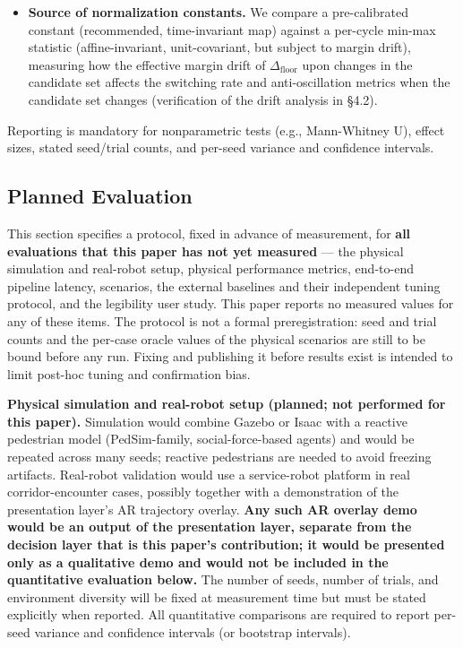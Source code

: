 \documentclass[11pt]{article}
\newcommand{\Dfloor}{\Delta_{\text{floor}}}
\begin{document}
\begin{itemize}
\item \textbf{Source of normalization constants.} We compare a pre-calibrated constant (recommended, time-invariant map) against a per-cycle min-max statistic (affine-invariant, unit-covariant, but subject to margin drift), measuring how the effective margin drift of $\Dfloor$ upon changes in the candidate set affects the switching rate and anti-oscillation metrics when the candidate set changes (verification of the drift analysis in \S4.2).
\end{itemize}

Reporting is mandatory for nonparametric tests (e.g., Mann-Whitney U), effect sizes, stated seed/trial counts, and per-seed variance and confidence intervals.

\FloatBarrier
\subsection{Planned Evaluation}

This section specifies a protocol, fixed in advance of measurement, for \textbf{all evaluations that this paper has not yet measured} --- the physical simulation and real-robot setup, physical performance metrics, end-to-end pipeline latency, scenarios, the external baselines and their independent tuning protocol, and the legibility user study. This paper reports no measured values for any of these items. The protocol is not a formal preregistration: seed and trial counts and the per-case oracle values of the physical scenarios are still to be bound before any run. Fixing and publishing it before results exist is intended to limit post-hoc tuning and confirmation bias.

\textbf{Physical simulation and real-robot setup (planned; not performed for this paper).} Simulation would combine Gazebo or Isaac with a reactive pedestrian model (PedSim-family, social-force-based agents) and would be repeated across many seeds; reactive pedestrians are needed to avoid freezing artifacts. Real-robot validation would use a service-robot platform in real corridor-encounter cases, possibly together with a demonstration of the presentation layer's AR trajectory overlay. \textbf{Any such AR overlay demo would be an output of the presentation layer, separate from the decision layer that is this paper's contribution; it would be presented only as a qualitative demo and would not be included in the quantitative evaluation below.} The number of seeds, number of trials, and environment diversity will be fixed at measurement time but must be stated explicitly when reported. All quantitative comparisons are required to report per-seed variance and confidence intervals (or bootstrap intervals).
\end{document}
